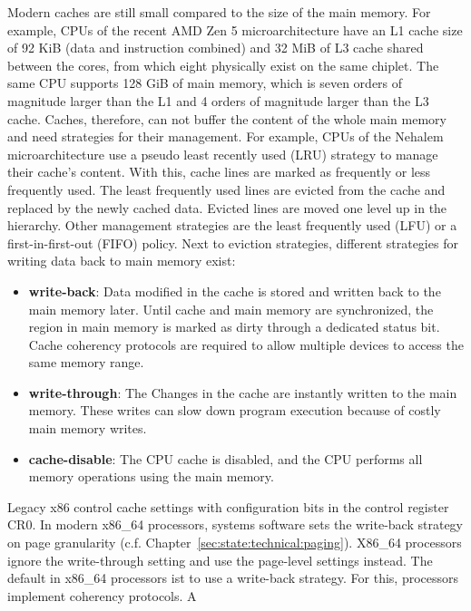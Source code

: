 Modern caches are still small compared to the size of the main memory. For
example, CPUs of the recent AMD Zen 5 microarchitecture have an L1 cache size of
92 KiB (data and instruction combined) and 32 MiB of L3 cache shared between the
cores, from which eight physically exist on the same chiplet. The same CPU
supports 128 GiB of main memory, which is seven orders of magnitude larger than
the L1 and 4 orders of magnitude larger than the L3 cache. Caches, therefore,
can not buffer the content of the whole main memory and need strategies for
their management. For example, CPUs of the Nehalem microarchitecture use a
pseudo least recently used (LRU) strategy to manage their cache's
content.\cite{hennessy2011computer} With this, cache lines are marked as
frequently or less frequently used. The least frequently used lines are evicted
from the cache and replaced by the newly cached data. Evicted lines are moved
one level up in the hierarchy. Other management strategies are the least
frequently used (LFU) or a first-in-first-out (FIFO) policy. Next to eviction
strategies, different strategies for writing data back to main memory exist:
\begin{itemize}
    \item \textbf{write-back}: Data modified in the cache is stored and written
          back to the main memory later. Until cache and main memory are
          synchronized, the region in main memory is marked as dirty through a
          dedicated status bit. Cache coherency protocols are required to allow
          multiple devices to access the same memory range.
    \item \textbf{write-through}: The Changes in the cache are instantly written
          to the main memory. These writes can slow down program execution
          because of costly main memory writes.
    \item \textbf{cache-disable}: The CPU cache is disabled, and the CPU
          performs all memory operations using the main memory.
\end{itemize}
Legacy x86 control cache settings with configuration bits in the control
register CR0. In modern x86\_64 processors, systems software sets the write-back
strategy on page granularity (c.f. Chapter~\ref{sec:state:technical:paging}).
X86\_64 processors ignore the write-through setting and use the page-level
settings instead. \cite{amd_manual} The default in x86\_64 processors ist to use
a write-back strategy. For this, processors implement coherency protocols. A
